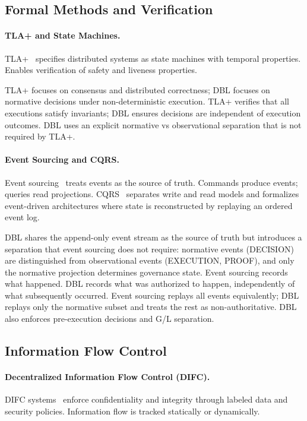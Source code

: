 \subsection{Formal Methods and Verification}

\paragraph{TLA+ and State Machines.}
TLA+~\cite{lamport2002specifying} specifies distributed systems as state machines with temporal properties. Enables verification of safety and liveness properties.

TLA+ focuses on consensus and distributed correctness; DBL focuses on normative decisions under non-deterministic execution. TLA+ verifies that all executions satisfy invariants; DBL ensures decisions are independent of execution outcomes. DBL uses an explicit normative vs observational separation that is not required by TLA+.

\paragraph{Event Sourcing and CQRS.}
Event sourcing~\cite{fowler2005event} treats events as the source of truth. Commands produce events; queries read projections. CQRS~\cite{young2010cqrs} separates write and read models and formalizes event-driven architectures where state is reconstructed by replaying an ordered event log.

DBL shares the append-only event stream as the source of truth but introduces a separation that event sourcing does not require: normative events (DECISION) are distinguished from observational events (EXECUTION, PROOF), and only the normative projection determines governance state. Event sourcing records what happened. DBL records what was authorized to happen, independently of what subsequently occurred. Event sourcing replays all events equivalently; DBL replays only the normative subset and treats the rest as non-authoritative. DBL also enforces pre-execution decisions and G/L separation.

\subsection{Information Flow Control}

\paragraph{Decentralized Information Flow Control (DIFC).}
DIFC systems~\cite{myers1999jflow,zeldovich2006making} enforce confidentiality and integrity through labeled data and security policies. Information flow is tracked statically or dynamically.

